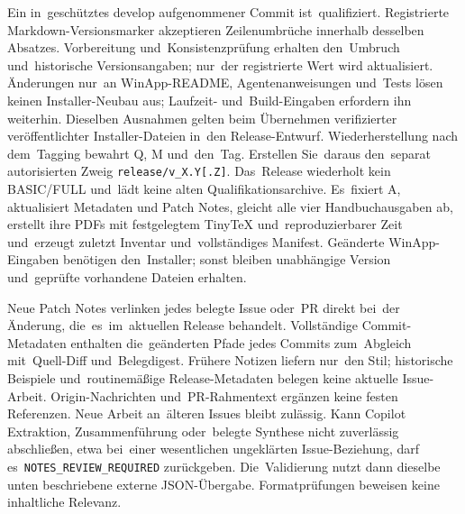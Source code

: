 \documentclass[11pt,a4paper]{article}
\newcommand{\codeword}[1]{\nolinkurl{#1}}
\begin{document}
Ein in~geschütztes develop aufgenommener Commit ist~qualifiziert.
Registrierte Markdown-Versionsmarker akzeptieren Zeilenumbrüche innerhalb
desselben Absatzes. Vorbereitung und~Konsistenzprüfung erhalten den~Umbruch
und~historische Versionsangaben; nur~der registrierte Wert wird aktualisiert.
Änderungen nur~an WinApp-README, Agentenanweisungen und~Tests lösen keinen
Installer-Neubau aus; Laufzeit- und~Build-Eingaben erfordern ihn weiterhin.
Dieselben Ausnahmen gelten beim Übernehmen verifizierter veröffentlichter
Installer-Dateien in~den Release-Entwurf. Wiederherstellung nach dem~Tagging
bewahrt Q, M und~den~Tag.
Erstellen Sie~daraus den~separat autorisierten Zweig
\codeword{release/v_X.Y[.Z]}. Das~Release wiederholt kein BASIC/FULL und~lädt
keine alten Qualifikationsarchive. Es~fixiert A, aktualisiert Metadaten und
Patch Notes, gleicht alle vier Handbuchausgaben ab, erstellt ihre PDFs mit
festgelegtem TinyTeX und~reproduzierbarer Zeit und~erzeugt zuletzt Inventar
und~vollständiges Manifest. Geänderte WinApp-Eingaben benötigen den~Installer;
sonst bleiben unabhängige Version und~geprüfte vorhandene Dateien erhalten.

Neue Patch Notes verlinken jedes belegte Issue oder~PR direkt bei~der Änderung,
die~es~im~aktuellen Release behandelt. Vollständige Commit-Metadaten enthalten
die~geänderten Pfade jedes Commits zum~Abgleich mit~Quell-Diff und~Belegdigest.
Frühere Notizen liefern nur~den Stil; historische Beispiele und~routinemäßige
Release-Metadaten belegen keine aktuelle Issue-Arbeit. Origin-Nachrichten
und~PR-Rahmentext ergänzen keine festen Referenzen. Neue Arbeit an~älteren
Issues
bleibt zulässig. Kann Copilot Extraktion, Zusammenführung oder~belegte Synthese
nicht zuverlässig abschließen, etwa bei~einer wesentlichen ungeklärten
Issue-Beziehung, darf es~\codeword{NOTES_REVIEW_REQUIRED} zurückgeben.
Die~Validierung nutzt dann dieselbe unten beschriebene externe JSON-Übergabe.
Formatprüfungen beweisen keine inhaltliche Relevanz.
\end{document}
